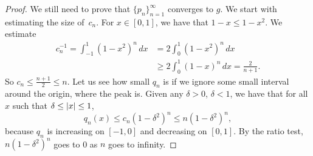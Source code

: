 \begin{proof}
We still need to prove that $\{ p_n \}_{n=1}^\infty$ converges to $g$.
We start with estimating the size of~$c_n$.
For $x \in [0,1]$, we have that $1-x \leq 1-x^2$.  We estimate
\begin{equation*}
\begin{split}
c_n^{-1}   = \int_{-1}^1 {(1-x^2)}^n \, dx
& = 2\int_0^1 {(1-x^2)}^n \, dx \\
& \geq 2\int_0^{1} {(1-x)}^n \, dx
= \frac{2}{n+1} .
\end{split}
\end{equation*}
So $c_n \leq \frac{n+1}{2} \leq n$.
Let us see how small $q_n$ is if we ignore some small interval around the origin,
where the peak is.
Given any $\delta > 0$, $\delta < 1$,
we have that for all
$x$ such that $\delta \leq \lvert {x} \rvert \leq 1$,
\begin{equation*}
q_n(x) \leq c_n {(1-\delta^2)}^n \leq  n{(1-\delta^2)}^n ,
\end{equation*}
because $q_n$ is increasing on $[-1,0]$ and decreasing on $[0,1]$.
By the ratio test, 
$n{(1-\delta^2)}^n$ goes to 0 as $n$ goes to infinity.


\end{proof}
